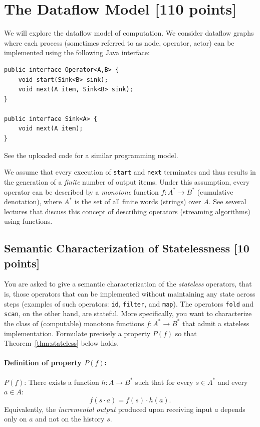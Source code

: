 \documentclass[11pt]{article}
\newcommand{\mnt}[1]{{\small\texttt{#1}}}
\theoremstyle{definition}
\newcommand{\kstar}{^{\textstyle *}}
\begin{document}
\clearpage %
\section{The Dataflow Model [110 points]}

We will explore the dataflow model of computation. We consider dataflow graphs where each process (sometimes referred to as node, operator, actor) can be implemented using the following Java interface:
\begin{verbatim}
public interface Operator<A,B> {
	void start(Sink<B> sink);
	void next(A item, Sink<B> sink);
}

public interface Sink<A> {
	void next(A item);
}
\end{verbatim}
See the uploaded code for a similar programming model.

We assume that every execution of \mnt{start} and \mnt{next} terminates and thus results in the generation of a \emph{finite} number of output items. Under this assumption, every operator can be described by a \emph{monotone} function $f: A\kstar \to B\kstar$ (cumulative denotation), where $A\kstar$ is the set of all finite words (strings) over $A$. See several lectures that discuss this concept of describing operators (streaming algorithms) using functions.

\subsection{Semantic Characterization of Statelessness [10 points]}

You are asked to give a semantic characterization of the \emph{stateless} operators, that is, those operators that can be implemented without maintaining any state across steps (examples of such operators: \mnt{id}, \mnt{filter}, and \mnt{map}). The operators \mnt{fold} and \mnt{scan}, on the other hand, are stateful. More specifically, you want to characterize the class of (computable) monotone functions $f: A\kstar \to B\kstar$ that admit a stateless implementation. Formulate precisely a property $P(f)$ so that Theorem~\ref{thm:stateless} below holds.

\paragraph{Definition of property $P(f)$:}
%
$P(f)$: There exists a function $h: A \to B\kstar$ such that for every $s \in A\kstar$ and every $a \in A$:
\[
	f(s \cdot a) = f(s) \cdot h(a).
\]
Equivalently, the \emph{incremental output} produced upon receiving input $a$ depends only on $a$ and not on the history $s$.
\end{document}
